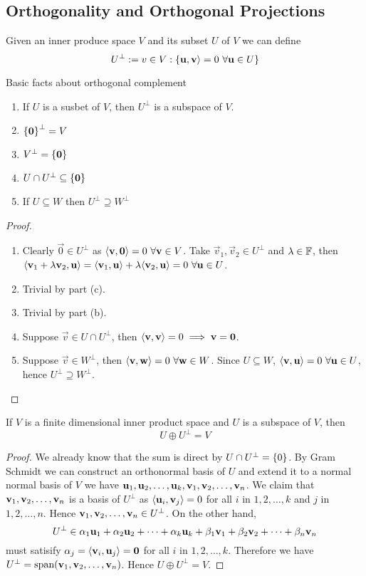 \subsection{Orthogonality and Orthogonal Projections}
\begin{definition}
    Given an inner produce space $V$ and its subset $U$ of $V$ we can define 
    \[ U^\perp := \mathbb {\mathbf} v \in V : \left\{ \mathbf u , \mathbf v \rangle = 0 \ \forall \mathbf u \in U \right\} \]
\end{definition}
\begin{theorem}
Basic facts about orthogonal complement
\begin{enumerate}[label = (\alph*)]
    \item If $U$ is a susbet of $V$, then $U^\perp$ is a subspace of $V$.
    \item $\left\{ \mathbf 0 \right\}^\perp = V$
    \item $V^\perp = \left\{ \mathbf 0 \right\}$
    \item $U \cap U^\perp \subseteq \left\{ \mathbf 0 \right\}$ 
    \item If $U \subseteq W$ then $U^\perp \supseteq W^\perp$
\end{enumerate}
\end{theorem}
\begin{proof} $ $
\begin{enumerate}[label = (\alph*)] 
    \item Clearly $\vec 0 \in U^\perp$ as $\langle \mathbf v, \mathbf 0 \rangle = 0 \ \forall \mathbf v \in V$. Take $\vec v_1, \vec v_2 \in U^\perp$ and $\lambda \in \mathbb F$, then $\langle \mathbf v_1 + \lambda \mathbf v_2, \mathbf u \rangle = \langle \mathbf v_1, \mathbf u \rangle + \lambda \langle \mathbf v_2, \mathbf u \rangle = 0 \ \forall \mathbf u \in U$.
    \item Trivial by part (c).
    \item Trivial by part (b).
    \item Suppose $\vec v \in U \cap U^\perp$, then $\langle \mathbf v, \mathbf v \rangle = 0 \implies \mathbf v = \mathbf 0$.
    \item Suppose $\vec v \in W^\perp$, then $\langle \mathbf v, \mathbf w \rangle = 0 \ \forall \mathbf w \in W$. Since $U \subseteq W$, $\langle \mathbf v, \mathbf u \rangle = 0 \ \forall \mathbf u \in U$, hence $U^\perp \supseteq W^\perp$.
\end{enumerate}
\end{proof}
\begin{theorem}
    If $V$ is a finite dimensional inner product space and $U$ is a subspace of $V$, then \[U \oplus U^\perp = V\]
\end{theorem}
\begin{proof}
    We already know that the sum is direct by $U \cap U^\perp = \left\{ 0 \right\}$.  By Gram Schmidt we can construct an orthonormal basis of $U$ and extend it to a normal normal basis of $V$ we have ${\mathbf u}_1,{\mathbf u}_2, \ldots, {\mathbf u}_{k}, {\mathbf v}_1,{\mathbf v}_2, \ldots, {\mathbf v}_{n}$. We claim that ${\mathbf v}_1,{\mathbf v}_2, \ldots, {\mathbf v}_{n}$ is a basis of $U^\perp$ as $\langle \mathbf u_i, \mathbf v_j \rangle = 0$ for all $i$ in $1,2, \ldots, k$ and $j$ in $1,2, \ldots, n$. Hence ${\mathbf v}_1,{\mathbf v}_2, \ldots, {\mathbf v}_{n} \in U^\perp$. On the other hand, 
    \[ U^\perp \in {\alpha}_1{\mathbf u}_1 + {\alpha}_2{\mathbf u}_2 + \cdots + {\alpha}_{k}{\mathbf u}_{k} + {\beta}_1{\mathbf v}_1 + {\beta}_2{\mathbf v}_2 + \cdots + {\beta}_{n}{\mathbf v}_{n} \]
    must satisify $\alpha_j = \langle \mathbf v_i, \mathbf u_j \rangle = \mathbf 0$ for all $i$ in $1,2, \ldots, k$. Therefore we have $U^\perp = \text{span} ({\mathbf v}_1,{\mathbf v}_2, \ldots, {\mathbf v}_{n})$. Hence $U \oplus U^\perp = V$.
\end{proof}